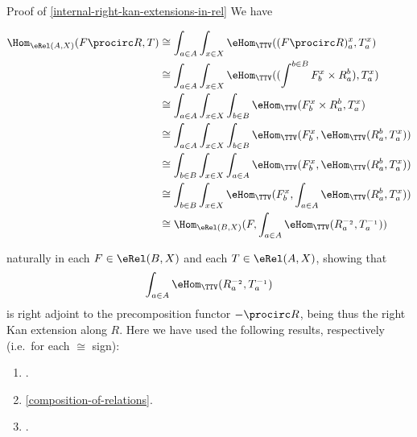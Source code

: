 \begin{Proof}{Proof of \cref{internal-right-kan-extensions-in-rel}}%
    We have
    \begin{envsmallsize}
        \begin{align*}
            \Hom_{\eRel(A,X)}(F\procirc R,T) &\cong  \int_{a\in A}\int_{x\in X}\eHom_{\TTV}((F\procirc R)^{x}_{a},T^{x}_{a})\\
                                             &\cong  \int_{a\in A}\int_{x\in X}\eHom_{\TTV}((\int^{b\in B}F^{x}_{b}\times R^{b}_{a}),T^{x}_{a})\\
                                             &\cong  \int_{a\in A}\int_{x\in X}\int_{b\in B}\eHom_{\TTV}(F^{x}_{b}\times R^{b}_{a},T^{x}_{a})\\
                                             &\cong  \int_{a\in A}\int_{x\in X}\int_{b\in B}\eHom_{\TTV}(F^{x}_{b},\eHom_{\TTV}(R^{b}_{a},T^{x}_{a}))\\
                                             &\cong  \int_{b\in B}\int_{x\in X}\int_{a\in A}\eHom_{\TTV}(F^{x}_{b},\eHom_{\TTV}(R^{b}_{a},T^{x}_{a}))\\
                                             &\cong  \int_{b\in B}\int_{x\in X}\eHom_{\TTV}(F^{x}_{b},\int_{a\in A}\eHom_{\TTV}(R^{b}_{a},T^{x}_{a}))\\
                                             &\cong  \Hom_{\eRel(B,X)}(F,\int_{a\in A}\eHom_{\TTV}(R^{-_{2}}_{a},T^{-_{1}}_{a}))%
        \end{align*}
    \end{envsmallsize}
    naturally in each $F\in\eRel(B,X)$ and each $T\in\eRel(A,X)$, showing that
    \[
        \int_{a\in A}\eHom_{\TTV}(R^{-_{2}}_{a},T^{-_{1}}_{a})%
    \]%
    is right adjoint to the precomposition functor $-\procirc R$, being thus the right Kan extension along $R$. Here we have used the following results, respectively (i.e.\ for each $\cong$ sign):
    \begin{enumerate}
        \item\label{proof-of-existence-of-right-kan-extensions-in-rel-1}.
        \item\label{proof-of-existence-of-right-kan-extensions-in-rel-2}\cref{composition-of-relations}.
        \item\label{proof-of-existence-of-right-kan-extensions-in-rel-3}.

\end{enumerate}
\end{Proof}
